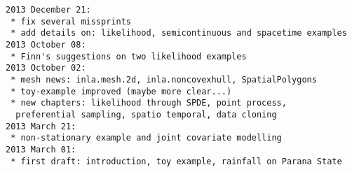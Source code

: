\begin{verbatim}
2013 December 21: 
 * fix several missprints
 * add details on: likelihood, semicontinuous and spacetime examples 
2013 October 08: 
 * Finn's suggestions on two likelihood examples 
2013 October 02:
 * mesh news: inla.mesh.2d, inla.noncovexhull, SpatialPolygons 
 * toy-example improved (maybe more clear...) 
 * new chapters: likelihood through SPDE, point process, 
  preferential sampling, spatio temporal, data cloning
2013 March 21:
 * non-stationary example and joint covariate modelling
2013 March 01: 
 * first draft: introduction, toy example, rainfall on Parana State
\end{verbatim}
